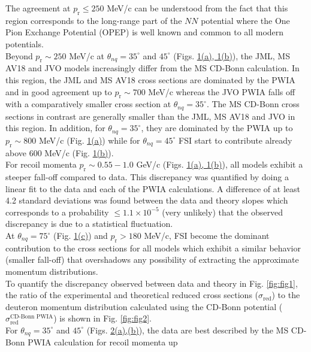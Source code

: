 \documentclass[aps,prl,twocolumn,showpacs,superscriptaddress,groupedaddress,nofootinbib]{revtex4-2}  %
\begin{document}
The agreement at $p_{\mathrm{r}}\leq250$ MeV/c can be understood from the fact that this region corresponds to the long-range part of the $NN$ potential where the One Pion Exchange Potential (OPEP)
is well known and common to all modern potentials. \\
\indent Beyond $p_{\mathrm{r}}\sim250$ MeV/c at $\theta_{nq}=35^{\circ}$ and $45^{\circ}$ (Figs. \hyperref[fig:fig1]{1(a), 1(b)}), the JML,
MS AV18 and JVO models increasingly differ from the MS CD-Bonn calculation. In this region, the JML and MS AV18 cross sections are dominated by the PWIA and in good agreement up to $p_{\mathrm{r}}\sim700$ MeV/c whereas
the JVO PWIA falls off with a comparatively smaller cross section at $\theta_{nq}=35^{\circ}$. The MS CD-Bonn cross sections in contrast are generally smaller than the JML, MS AV18 and JVO in this region.
In addition, for $\theta_{nq}=35^{\circ}$, they are dominated by the PWIA up to $p_{\mathrm{r}}\sim800$ MeV/c
(Fig. \hyperref[fig:fig1]{1(a)})  while for $\theta_{nq}=45^{\circ}$  FSI start to contribute already above 600 MeV/c (Fig. \hyperref[fig:fig1]{1(b)}).\\
\indent For recoil momenta $p_{\mathrm{r}} \sim 0.55-1.0$ GeV/c (Figs. \hyperref[fig:fig1]{1(a), 1(b)}), all models exhibit a
steeper fall-off compared to data. This discrepancy was quantified by doing a linear fit to the data and each of the PWIA calculations. A difference of at least
4.2 standard deviations was found between the data and theory slopes which corresponds to a probability $\leq 1.1\times 10^{-5}$ (very unlikely) that the observed discrepancy is due to a statistical fluctuation. \\ 
\indent At $\theta_{nq}=75^{\circ}$ (Fig. \hyperref[fig:fig1]{1(c)}) and $p_{\mathrm{r}}>180$ MeV/c, FSI become the dominant contribution to the cross sections for all models which exhibit a similar
behavior (smaller fall-off) that overshadows any possibility of extracting the approximate momentum distributions.\\
\indent To quantify the discrepancy observed between data and theory in Fig. \ref{fig:fig1}, the ratio of the experimental and theoretical reduced cross sections ($\sigma_{\mathrm{red}}$) to the
deuteron momentum distribution calculated using the CD-Bonn potential ($\sigma^{\text{CD-Bonn PWIA}}_{\mathrm{red}}$) \cite{PhysRevC.63.024001} is shown in Fig. \ref{fig:fig2}. \\
\indent For $\theta_{nq}=35^{\circ}$ and $45^{\circ}$ (Figs. \hyperref[fig:fig2]{2(a),(b)}), the data are best described by the MS CD-Bonn PWIA calculation for recoil momenta up
\end{document}
